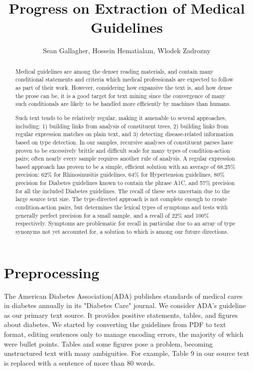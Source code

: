 \documentclass[12pt,letterpaper]{article}
\author{Sean Gallagher, Hossein Hematialam, Wlodek Zadrozny}
\title{Progress on Extraction of Medical Guidelines}
\begin{document}
\maketitle
\begin{abstract}
Medical guidelines are among the denser reading materials, and contain many conditional statements and criteria which medical professionals are expected to follow as part of their work. However, considering how expansive the text is, and how dense the prose can be, it is a good target for text mining since the convergence of many such conditionals are likely to be handled more efficiently by machines than humans.

Such text tends to be relatively regular, making it amenable to several approaches, including: 1) building links from analysis of constituent trees, 2) building links from regular expression matches on plain text, and 3) detecting disease-related information based on type detection. In our samples, recursive analyses of constituent parses have proven to be excessively brittle and difficult scale for many types of condition-action pairs; often nearly every sample requires another rule of analysis. A regular expression based approach has proven to be a simple, efficient solution with an average of 68.25\% precision: 62\% for Rhinosinusitis guidelines, 64\% for Hypertension guidelines, 80\% precision for Diabetes guidelines known to contain the phrase A1C, and 57\% precision for all the included Diabetes guidelines. The recall of these sets uncertain due to the large source text size. The type-directed approach is not complete enough to create condition-action pairs, but determines the lexical types of symptoms and tests with generally perfect precision for a small sample, and a recall of 22\% and 100\% respectively. Symptoms are problematic for recall in particular due to an array of type synonyms not yet accounted for, a solution to which is among our future directions.
\end{abstract}

\section{Preprocessing}
The American Diabetes Association(ADA) publishes standards of medical cares in diabetes annually in its "Diabetes Care" journal. We consider ADA's guideline\cite{american2013diagnosis} as our primary text source. It provides positive statements, tables, and figures about diabetes. We started by converting the guidelines from PDF to text format, editing sentences only to manage encoding errors, the majority of which were bullet points. Tables and some figures pose a problem, becoming unstructured text with many ambiguities. For example, Table 9 in our source text is replaced with a sentence of more than 80 words.
\end{document}
